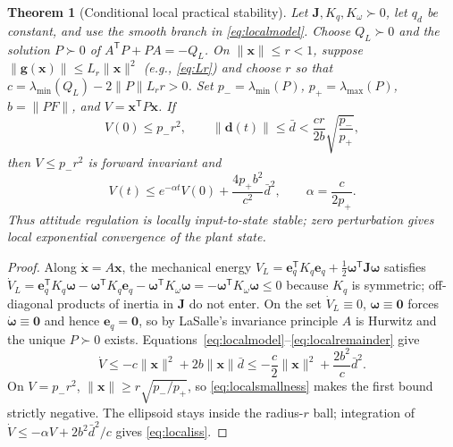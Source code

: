 \documentclass[letterpaper, 10 pt, conference]{ieeeconf}
\newtheorem{theorem}{Theorem}
\newcommand{\T}{^{\mathsf T}}
\begin{document}
\begin{theorem}[Conditional local practical stability]
\label{thm:local}
Let $\bm J,K_q,K_\omega\succ0$, let $q_d$ be constant, and use the smooth
branch in \eqref{eq:localmodel}. Choose $Q_L\succ0$ and the solution
$P\succ0$ of $A\T P+PA=-Q_L$. On $\|\bm x\|\le r<1$, suppose
$\|\bm g(\bm x)\|\le L_r\|\bm x\|^2$ (e.g., \eqref{eq:Lr}) and choose $r$ so that
$c=\lambda_{\min}(Q_L)-2\|P\|L_r r>0$.
Set $p_- =\lambda_{\min}(P)$, $p_+=\lambda_{\max}(P)$,
$b=\|PF\|$, and $V=\bm x\T P\bm x$. If
\begin{equation}
 V(0)\le p_-r^2,\qquad
 \|\bm d(t)\|\le\bar d<\frac{cr}{2b}\sqrt{\frac{p_-}{p_+}},
 \label{eq:localsmallness}
\end{equation}
then $V\le p_-r^2$ is forward invariant and
\begin{equation}
 V(t)\le e^{-\alpha t}V(0)+\frac{4p_+b^2}{c^2}\bar d^2,
 \qquad \alpha=\frac{c}{2p_+}.
 \label{eq:localiss}
\end{equation}
Thus attitude regulation is locally input-to-state stable; zero
perturbation gives local exponential convergence of the plant state.
\end{theorem}
\begin{proof}
Along $\dot{\bm x}=A\bm x$, the mechanical energy
$V_L=\bm e_q\T K_q\bm e_q+\frac12\bm\omega\T\bm J\bm\omega$ satisfies
$\dot V_L=\bm e_q\T K_q\bm\omega-\bm\omega\T K_q\bm e_q
-\bm\omega\T K_\omega\bm\omega=-\bm\omega\T K_\omega\bm\omega\le0$ because
$K_q$ is symmetric; off-diagonal products of inertia in $\bm J$ do not
enter. On the set $\dot V_L\equiv0$, $\bm\omega\equiv\bm0$ forces
$\dot{\bm\omega}\equiv\bm0$ and hence $\bm e_q=\bm0$, so by LaSalle's
invariance principle \cite{khalil2002nonlinear} $A$ is Hurwitz and the
unique $P\succ0$ exists.
Equations~\eqref{eq:localmodel}--\eqref{eq:localremainder} give
\[
 \dot V\le-c\|\bm x\|^2+2b\|\bm x\|\bar d
 \le-\frac c2\|\bm x\|^2+\frac{2b^2}{c}\bar d^2.
\]
On $V=p_-r^2$, $\|\bm x\|\ge r\sqrt{p_-/p_+}$, so
\eqref{eq:localsmallness} makes the first bound strictly negative.
The ellipsoid stays inside the radius-$r$ ball; integration of
$\dot V\le-\alpha V+2b^2\bar d^2/c$ gives \eqref{eq:localiss}.
\end{proof}
\end{document}
